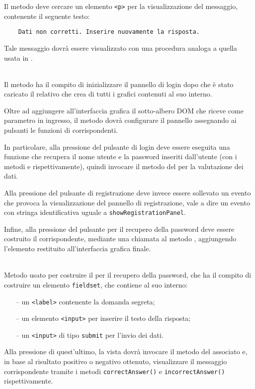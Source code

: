\begin{description}
	Il metodo deve cercare un elemento \verb'<p>' per la visualizzazione del messaggio, contenente il seguente testo:
\begin{verbatim}
	Dati non corretti. Inserire nuovamente la risposta.
\end{verbatim}
	
	Tale messaggio dovrà essere visualizzato con una procedura analoga a quella usata in .

	\item{}\\
	Il metodo ha il compito di inizializzare il pannello di login dopo che è stato caricato il relativo  che crea di tutti i  grafici contenuti al suo interno.
	
	Oltre ad aggiungere all'interfaccia grafica il sotto-albero DOM che riceve come parametro in ingresso, il metodo dovrà configurare il pannello assegnando ai pulsanti le funzioni di  corrispondenti.
	
	In particolare, alla pressione del pulsante di login deve essere eseguita una funzione che recupera il nome utente e la password inseriti dall'utente (con i metodi  e  rispettivamente), quindi invocare il metodo  del  per la valutazione dei dati.
	
	Alla pressione del pulsante di registrazione deve invece essere sollevato un evento che provoca la visualizzazione del pannello di registrazione, vale a dire un evento con stringa identificativa uguale a \verb'showRegistrationPanel'.
	
	Infine, alla pressione del pulsante per il recupero della password deve essere costruito il  corrispondente, mediante una chiamata al metodo , aggiungendo l'elemento restituito all'interfaccia grafica finale.
	
	\item{}\\
	Metodo usato per costruire il  per il recupero della password, che ha il compito di costruire un elemento \verb'fieldset', che contiene al suo interno:
	\begin{itemize}
	  \item[--] un \verb'<label>' contenente la domanda segreta;
	  \item[--] un elemento \verb'<input>' per inserire il testo della risposta;
	  \item[--] un \verb'<input>' di tipo \verb'submit' per l'invio dei dati.
	\end{itemize}
Alla pressione di quest'ultimo, la vista dovrà invocare il metodo  del  associato e, in base al risultato positivo o negativo ottenuto, visualizzare il messaggio corrispondente tramite i metodi \verb'correctAnswer()' e \verb'incorrectAnswer()' rispettivamente.


\end{description}
